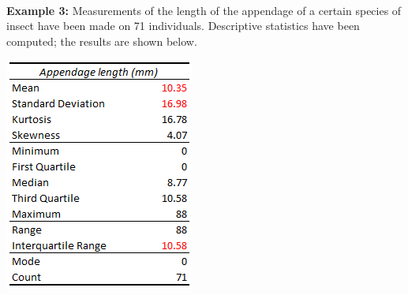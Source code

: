 \documentclass[20pt,landscape,footrule,headrule]{foils}
\begin{document}
\newpage\ \\ \noindent \textbf{Example 3:} Measurements of the length of the appendage of a certain species of insect have been made on 71 individuals. Descriptive statistics have been computed; the results are shown below.
\begin{center}\includegraphics[height=0.72\textheight]{Images/appendage_length_descriptive_EN}
\end{center}  
\end{document}
